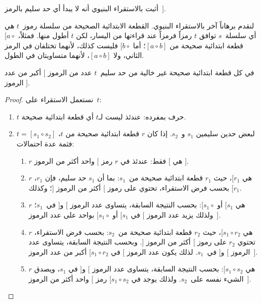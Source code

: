 \documentclass[../../../include/open-logic-section]{subfiles}
\begin{document}
\begin{prob}
  أثبت بالاستقراء البنيوي أنه لا يبدأ أي حد سليم بالرمز~$]$.
\end{prob}

لنقدم برهاناً آخر بالاستقراء البنيوي. القطعة الابتدائية الصحيحة من سلسلة
رموز~$t$ هي أي سلسلة~$s$ توافق $t$ رمزاً فرمزاً عند قراءتها من اليسار،
لكن $t$ أطول منها. فمثلاً، $[a \circ {}$ قطعة ابتدائية صحيحة من
$[a \circ b]$؛ أما $[b \circ {}$ فليست كذلك، لأنهما تختلفان في الرمز
الثاني، ولا $[a \circ b]$، لأنهما متساويتان في الطول.

\begin{prop}
  في كل قطعة ابتدائية صحيحة غير خالية من حد سليم~$t$ عدد من الرموز $[$ أكبر من
  عدد الرموز $]$.
\end{prop}

\begin{proof}
  نستعمل الاستقراء على~$t$:
  \begin{enumerate}
  \item $t$ حرف بمفرده: عندئذ ليست لـ$t$ أي قطعة ابتدائية صحيحة.
  \item $t = [s_1 \circ s_2]$ لبعض حدين سليمين $s_1$ و~$s_2$. إذا
    كان $r$ قطعة ابتدائية صحيحة من $t$، فثمة عدة احتمالات:
    \begin{enumerate}
    \item $r$ هي $[$ فقط: عندئذ في $r$ رمز $[$ واحد أكثر من الرموز
      $]$.
    \item $r$ هي $[r_1$، حيث $r_1$ قطعة ابتدائية صحيحة من~$s_1$:
      بما أن $s_1$ حد سليم، فإن $r_1$، بحسب فرض الاستقراء، تحتوي على
      رموز $[$ أكثر من الرموز $]$؛ وكذلك $[r_1$.
    \item $r$ هي $[s_1$ أو $[s_1 \circ {}$: بحسب النتيجة السابقة،
      يتساوى عدد الرموز $[$ و$]$ في~$s_1$؛ ولذلك يزيد عدد الرموز $[$
      في $[s_1$ أو $[s_1 \circ {}$ بواحد على عدد الرموز~$]$.
    \item $r$ هي $[s_1 \circ r_2$، حيث $r_2$ قطعة ابتدائية صحيحة
      من~$s_2$: بحسب فرض الاستقراء، تحتوي $r_2$ على رموز $[$ أكثر من
      الرموز $]$. وبحسب النتيجة السابقة، يتساوى عدد الرموز $[$ و$]$
      في~$s_1$. لذلك يكون عدد الرموز $[$ في $[s_1 \circ r_2$ أكبر من
      عدد الرموز~$]$.
    \item $r$ هي $[s_1 \circ s_2$: بحسب النتيجة السابقة، يتساوى عدد
      الرموز $[$ و$]$ في $s_1$، ويصدق الشيء نفسه على~$s_2$. ولذلك
      يوجد في $[s_1 \circ s_2$ رمز $[$ واحد أكثر من الرموز~$]$.
    \end{enumerate}
  \end{enumerate}
\end{proof}
\end{document}
